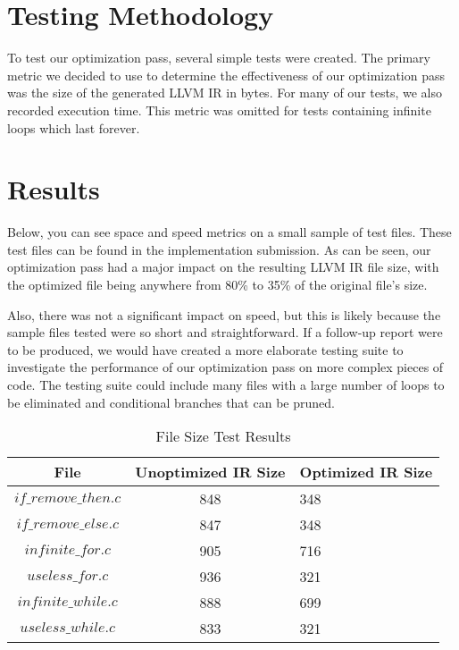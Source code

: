 \documentclass[sigconf]{acmart}
\begin{document}
\section{Testing Methodology}
To test our optimization pass, several simple tests were created. The primary metric 
we decided to use to determine the effectiveness of our optimization pass was the size of the generated 
LLVM IR in bytes. For many of our tests, we also recorded execution time. This metric was omitted 
for tests containing infinite loops which last forever.



\section{Results}
Below, you can see space and speed metrics on a small sample of test files. These test files can 
be found in the implementation submission.
As can be seen, our optimization pass had a major impact on the resulting LLVM IR file size, with the 
optimized file being anywhere from 80\% to 35\% of the original file's size. 

Also, there was not a significant impact on speed, but this is likely because the sample files tested were so 
short and straightforward. If a follow-up report were to be produced, we would have created a more 
elaborate testing suite to investigate the performance of our optimization pass on more complex 
pieces of code. The testing suite could include many files with a large number of loops to be 
eliminated and conditional branches that can be pruned.



\begin{table*}
  \caption{File Size Test Results}
  \begin{tabular}{ccl}
    \toprule
    File & Unoptimized IR Size & Optimized IR Size \\
    \midrule
    \texttt{$if\_remove\_then.c$}& 848& 348 \\
    \texttt{$if\_remove\_else.c$}&  847& 348\\
    \texttt{$infinite\_for.c$}& 905& 716 \\
    \texttt{$useless\_for.c$}& 936& 321  \\
    \texttt{$infinite\_while.c$}& 888 & 699 \\
    \texttt{$useless\_while.c$}& 833 & 321  \\
    \bottomrule
  \end{tabular}
\end{table*}
\end{document}
